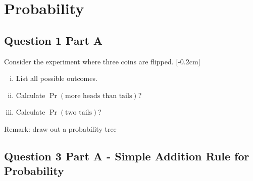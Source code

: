 

%
%
%
%
%
%
%
%








\section*{Probability}
\subsection*{Question 1 Part A}

Consider the experiment where three coins are flipped. [-0.2cm]
\begin{enumerate}[(i)]
\item List all possible outcomes. \item  Calculate $\Pr(\text{more heads than tails})$? \item Calculate $\Pr(\text{two tails})$?
\end{enumerate}
Remark: draw out a probability tree


























\subsection*{Question 3 Part A - Simple Addition Rule for Probability}

